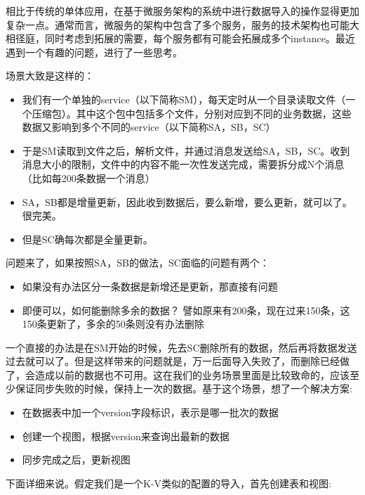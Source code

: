 \documentclass[12pt]{article}
\begin{document}
\makeblogtitle

相比于传统的单体应用，在基于微服务架构的系统中进行数据导入的操作显得更加复杂一点。通常而言，微服务的架构中包含了多个服务，服务的技术架构也可能大相径庭，同时考虑到拓展的需要，每个服务都有可能会拓展成多个instance。最近遇到一个有趣的问题，进行了一些思考。

场景大致是这样的：

\begin{itemize}
\tightlist
\item
  我们有一个单独的service（以下简称SM），每天定时从一个目录读取文件（一个压缩包）。其中这个包中包括多个文件，分别对应到不同的业务数据，这些数据又影响到多个不同的service（以下简称SA，SB，SC）
\item
  于是SM读取到文件之后，解析文件，并通过消息发送给SA，SB，SC。收到消息大小的限制，文件中的内容不能一次性发送完成，需要拆分成N个消息（比如每200条数据一个消息）
\item
  SA，SB都是增量更新，因此收到数据后，要么新增，要么更新，就可以了。很完美。
\item
  但是SC确每次都是全量更新。
\end{itemize}

问题来了，如果按照SA，SB的做法，SC面临的问题有两个：

\begin{itemize}
\tightlist
\item
  如果没有办法区分一条数据是新增还是更新，那直接有问题
\item
  即便可以，如何能删除多余的数据？ 譬如原来有200条，现在过来150条，这150条更新了，多余的50条则没有办法删除
\end{itemize}

一个直接的办法是在SM开始的时候，先去SC删除所有的数据，然后再将数据发送过去就可以了。但是这样带来的问题就是，万一后面导入失败了，而删除已经做了，会造成以前的数据也不可用。这在我们的业务场景里面是比较致命的，应该至少保证同步失败的时候，保持上一次的数据。基于这个场景，想了一个解决方案:

\begin{itemize}
\tightlist
\item
  在数据表中加一个version字段标识，表示是哪一批次的数据
\item
  创建一个视图，根据version来查询出最新的数据
\item
  同步完成之后，更新视图
\end{itemize}

下面详细来说。假定我们是一个K-V类似的配置的导入，首先创建表和视图:
\end{document}
